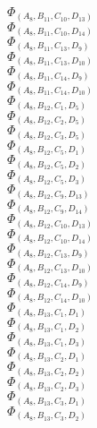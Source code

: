 \documentclass[14pt]{article}
\begin{document}
    $\Phi_{({A}_{8}, {B}_{11}, {C}_{10}, {D}_{13})}$ \\ 
    $\Phi_{({A}_{8}, {B}_{11}, {C}_{10}, {D}_{14})}$ \\ 
    $\Phi_{({A}_{8}, {B}_{11}, {C}_{13}, {D}_{9})}$ \\ 
    $\Phi_{({A}_{8}, {B}_{11}, {C}_{13}, {D}_{10})}$ \\ 
    $\Phi_{({A}_{8}, {B}_{11}, {C}_{14}, {D}_{9})}$ \\ 
    $\Phi_{({A}_{8}, {B}_{11}, {C}_{14}, {D}_{10})}$ \\ 
    $\Phi_{({A}_{8}, {B}_{12}, {C}_{1}, {D}_{5})}$ \\ 
    $\Phi_{({A}_{8}, {B}_{12}, {C}_{2}, {D}_{5})}$ \\ 
    $\Phi_{({A}_{8}, {B}_{12}, {C}_{3}, {D}_{5})}$ \\ 
    $\Phi_{({A}_{8}, {B}_{12}, {C}_{5}, {D}_{1})}$ \\ 
    $\Phi_{({A}_{8}, {B}_{12}, {C}_{5}, {D}_{2})}$ \\ 
    $\Phi_{({A}_{8}, {B}_{12}, {C}_{5}, {D}_{3})}$ \\ 
    $\Phi_{({A}_{8}, {B}_{12}, {C}_{9}, {D}_{13})}$ \\ 
    $\Phi_{({A}_{8}, {B}_{12}, {C}_{9}, {D}_{14})}$ \\ 
    $\Phi_{({A}_{8}, {B}_{12}, {C}_{10}, {D}_{13})}$ \\ 
    $\Phi_{({A}_{8}, {B}_{12}, {C}_{10}, {D}_{14})}$ \\ 
    $\Phi_{({A}_{8}, {B}_{12}, {C}_{13}, {D}_{9})}$ \\ 
    $\Phi_{({A}_{8}, {B}_{12}, {C}_{13}, {D}_{10})}$ \\ 
    $\Phi_{({A}_{8}, {B}_{12}, {C}_{14}, {D}_{9})}$ \\ 
    $\Phi_{({A}_{8}, {B}_{12}, {C}_{14}, {D}_{10})}$ \\ 
    $\Phi_{({A}_{8}, {B}_{13}, {C}_{1}, {D}_{1})}$ \\ 
    $\Phi_{({A}_{8}, {B}_{13}, {C}_{1}, {D}_{2})}$ \\ 
    $\Phi_{({A}_{8}, {B}_{13}, {C}_{1}, {D}_{3})}$ \\ 
    $\Phi_{({A}_{8}, {B}_{13}, {C}_{2}, {D}_{1})}$ \\ 
    $\Phi_{({A}_{8}, {B}_{13}, {C}_{2}, {D}_{2})}$ \\ 
    $\Phi_{({A}_{8}, {B}_{13}, {C}_{2}, {D}_{3})}$ \\ 
    $\Phi_{({A}_{8}, {B}_{13}, {C}_{3}, {D}_{1})}$ \\ 
    $\Phi_{({A}_{8}, {B}_{13}, {C}_{3}, {D}_{2})}$ \\ 
\end{document}
